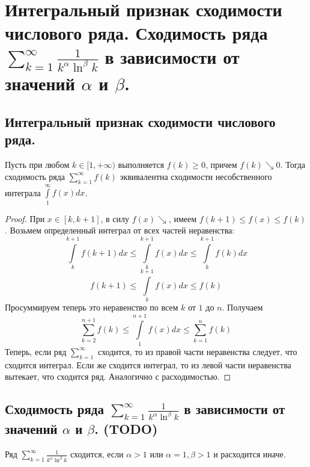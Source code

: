 \section{Интегральный признак сходимости числового ряда. Сходимость ряда $\sum_{k=1}^{\infty} \frac{1}{k^\alpha \ln^{\beta} k}$ в зависимости от значений $\alpha$ и $\beta$.}

\subsection{Интегральный признак сходимости числового ряда.}
\begin{theorem}
    Пусть при любом $k \in [1, +\infty)$ выполняется $f(k) \geqslant 0$, причем $f(k) \searrow 0$. Тогда сходимость ряда $\sum_{k=1}^{\infty} f(k)$ эквивалентна сходимости несобственного интеграла $\int \limits_{1}^{\infty} f(x) dx$.
    \begin{proof}
        При $x \in [k, k + 1]$, в силу $f(x) \searrow$, имеем $f(k + 1) \leqslant f(x) \leqslant f(k)$. Возьмем определенный интеграл от всех частей неравенства:
        \[
            \int \limits_k^{k+1} f(k+1) dx
            \leqslant
            \int \limits_{k}^{k+1} f(x) dx
            \leqslant
            \int \limits_{k}^{k+1} f(k) dx
        \]
        \[
            f(k+1)
            \leqslant
            \int \limits_{k}^{k+1} f(x) dx
            \leqslant
            f(k)
        \]
        Просуммируем теперь это неравенство по всем $k$ от $1$ до $n$. Получаем
        \[
            \sum_{k=2}^{n + 1} f(k)
            \leqslant
            \int \limits_1^{n+1} f(x) dx
            \leqslant
            \sum_{k=1}^{n} f(k)
        \]
        Теперь, если ряд $\sum_{k=1}^{\infty}$ сходится, то из правой части неравенства следует, что сходится интеграл. Если же сходится интеграл, то из левой части неравенства вытекает, что сходится ряд. Аналогично с расходимостью.
    \end{proof}
\end{theorem}

\subsection{Сходимость ряда $\sum_{k=1}^{\infty} \frac{1}{k^\alpha \ln^{\beta} k}$ в зависимости от значений $\alpha$ и $\beta$. (TODO)}
Ряд
\(
    \sum_{k=1}^{\infty} \frac{1}{k^\alpha \ln^{\beta} k}
\)
сходится, если $\alpha > 1$ или $\alpha = 1, \beta > 1$ и расходится иначе.